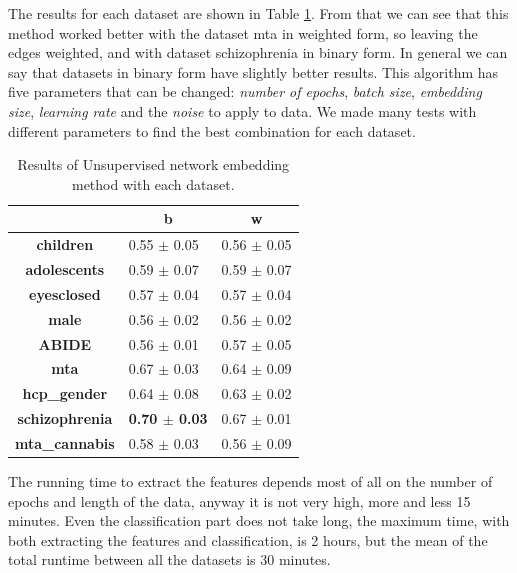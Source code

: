 The results for each dataset are shown in Table \ref{tab:embs}. From that we can see that this method worked better with the dataset mta in weighted form, so leaving the edges weighted, and with dataset schizophrenia in binary form. In general we can say that datasets in binary form have slightly better results. This algorithm has five parameters that can be changed: \textit{number of epochs}, \textit{batch size}, \textit{embedding size}, \textit{learning rate} and the \textit{noise} to apply to data. We made many tests with different parameters to find the best combination for each dataset.
\vspace{0.5cm}

\begin{table}
	\centering
	\begin{tabular}{c|l|c} 
		\toprule
		& \multicolumn{1}{c|}{b} & w                \\ 
		\midrule
		\textbf{children}      & 0.55 $\pm$ 0.05        & 0.56 $\pm$ 0.05  \\
		\textbf{adolescents}   & 0.59 $\pm$ 0.07        & 0.59 $\pm$ 0.07  \\
		\textbf{eyesclosed}    & 0.57 $\pm$ 0.04        & 0.57 $\pm$ 0.04  \\
		\textbf{male}          & 0.56 $\pm$ 0.02        & 0.56 $\pm$ 0.02  \\
		\textbf{ABIDE}         & 0.56 $\pm$ 0.01        & 0.57 $\pm$ 0.05  \\
		\textbf{mta}           & 0.67 $\pm$ 0.03        & 0.64 $\pm$ 0.09  \\
		\textbf{hcp\_gender}   & 0.64 $\pm$ 0.08        & 0.63 $\pm$ 0.02  \\
		\textbf{schizophrenia} & \textbf{0.70 $\pm$ 0.03}        & 0.67 $\pm$ 0.01  \\
		\textbf{mta\_cannabis} & 0.58 $\pm$ 0.03        & 0.56 $\pm$ 0.09 \\
		\bottomrule
	\end{tabular}
	\caption{Results of Unsupervised network embedding method with each dataset.}
	\label{tab:embs}
\end{table}

The running time to extract the features depends most of all on the number of epochs and length of the data, anyway it is not very high, more and less 15 minutes. Even the classification part does not take long, the maximum time, with both extracting the features and classification, is 2 hours, but the mean of the total runtime between all the datasets is 30 minutes.


